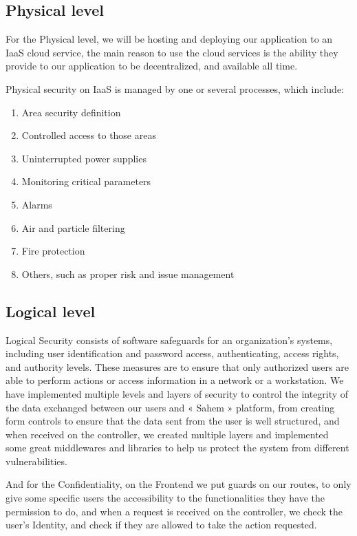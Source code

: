 \subsection{Physical level}
For the Physical level, we will be hosting and deploying our application to an IaaS cloud service, the main reason to use the cloud services is the ability they provide to our application to be decentralized, and available all time.

Physical security on IaaS is managed by one or several processes, which include:
\begin{enumerate}
      \item 
      Area security definition
      \item 
      Controlled access to those areas
      \item 
      Uninterrupted power supplies
      \item 
      Monitoring critical parameters
      \item 
      Alarms
      \item 
      Air and particle filtering
      \item 
      Fire protection
      \item 
      Others, such as proper risk and issue management
\end{enumerate}
\subsection{Logical level}
Logical Security consists of software safeguards for an organization's systems, including user identification and password access, authenticating, access rights, and authority levels. These measures are to ensure that only authorized users are able to perform actions or access information in a network or a workstation.
We have implemented multiple levels and layers of security to control the integrity of the data exchanged between our users and « Sahem » platform, from creating form controls to ensure that the data sent from the user is well structured, and when received on the controller, we created multiple layers and implemented some great middlewares and libraries to help us protect the system from different vulnerabilities.

And for the Confidentiality, on the Frontend we put guards on our routes, to only give some specific users the accessibility to the functionalities they have the permission to do, and when a request is received on the controller, we check the user's Identity, and check if they are allowed to take the action requested.
